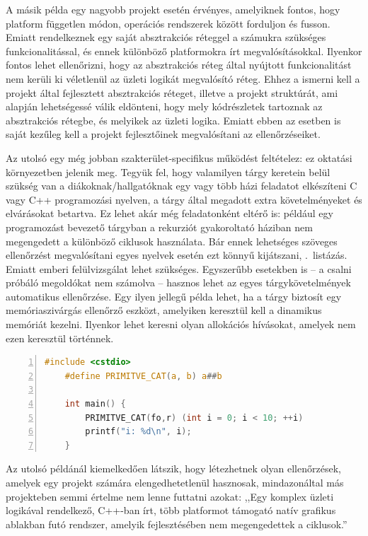 A másik példa egy nagyobb projekt esetén érvényes, amelyiknek fontos, hogy platform független módon, operációs rendszerek között forduljon és fusson.
Emiatt rendelkeznek egy saját absztrakciós réteggel a számukra szükséges funkcionalitással, és ennek különböző platformokra írt megvalósításokkal.
Ilyenkor fontos lehet ellenőrizni, hogy az absztrakciós réteg által nyújtott funkcionalitást nem kerüli ki véletlenül az üzleti logikát megvalósító réteg.
Ehhez a ismerni kell a projekt által fejlesztett absztrakciós réteget, illetve a projekt struktúrát, ami alapján lehetségessé válik eldönteni, hogy mely kódrészletek tartoznak az absztrakciós rétegbe, és melyikek az üzleti logika.
Emiatt ebben az esetben is saját kezűleg kell a projekt fejlesztőinek megvalósítani az ellenőrzéseiket.

Az utolsó egy még jobban szakterület-specifikus működést feltételez: ez oktatási környezetben jelenik meg.
Tegyük fel, hogy valamilyen tárgy keretein belül szükség van a diákoknak/hallgatóknak egy vagy több házi feladatot elkészíteni C vagy C++ programozási nyelven, a tárgy által megadott extra követelményeket és elvárásokat betartva.
Ez lehet akár még feladatonként eltérő is: például egy programozást bevezető tárgyban a rekurziót gyakoroltató háziban nem megengedett a különböző ciklusok használata.
Bár ennek lehetséges szöveges ellenőrzést megvalósítani egyes nyelvek esetén ezt könnyű kijátszani, \ld {}.~listázás.
Emiatt emberi felülvizsgálat lehet szükséges.
Egyszerűbb esetekben is -- a csalni próbáló megoldókat nem számolva -- hasznos lehet az egyes tárgykövetelmények automatikus ellenőrzése.
Egy ilyen jellegű példa lehet, ha a tárgy biztosít egy memóriaszivárgás ellenőrző eszközt, amelyiken keresztül kell a dinamikus memóriát kezelni. Ilyenkor lehet keresni olyan allokációs hívásokat, amelyek nem ezen keresztül történnek.

\begin{lstlisting}[gobble=4,numbers=left,label=lst:cpp-tricks,caption={Szöveges ellenőrzést kijátszó ,,for'' ciklus},language=c]
	#include <cstdio>
	#define PRIMITVE_CAT(a, b) a##b
	
	int main() {
		PRIMITVE_CAT(fo,r) (int i = 0; i < 10; ++i)
		printf("i: %d\n", i);
	}
\end{lstlisting}

Az utolsó példánál kiemelkedően látszik, hogy létezhetnek olyan ellenőrzések, amelyek egy projekt számára elengedhetetlenül hasznosak, mindazonáltal más projekteben semmi értelme nem lenne futtatni azokat: ,,Egy komplex üzleti logikával rendelkező, C++-ban írt, több platformot támogató natív grafikus ablakban futó rendszer, amelyik fejlesztésében nem megengedettek a ciklusok.''

